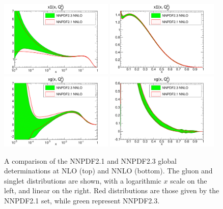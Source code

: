 \begin{figure}[hp!]
\includegraphics[width=0.48\textwidth]{6-LHCimpact/figs/xSinglet_Q_2_log-21-vs-23.pdf}
\includegraphics[width=0.48\textwidth]{6-LHCimpact/figs/xSinglet_Q_2_lin-21-vs-23.pdf}\\
\includegraphics[width=0.48\textwidth]{6-LHCimpact/figs/xg_Q_2_log-21-vs-23.pdf}
\includegraphics[width=0.48\textwidth]{6-LHCimpact/figs/xg_Q_2_lin-21-vs-23.pdf}
\caption[A comparison of the NNPDF2.1 and NNPDF2.3 gluon and singlet global determinations at NLO and NNLO]{A comparison of the NNPDF2.1 and NNPDF2.3 global determinations at NLO (top) and NNLO (bottom). The gluon and singlet distributions are shown, with a logarithmic $x$ scale on the left, and linear on the right. Red distributions are those given by the NNPDF2.1 set, while green represent NNPDF2.3.}
\label{fig:23vs21}
\end{figure}


